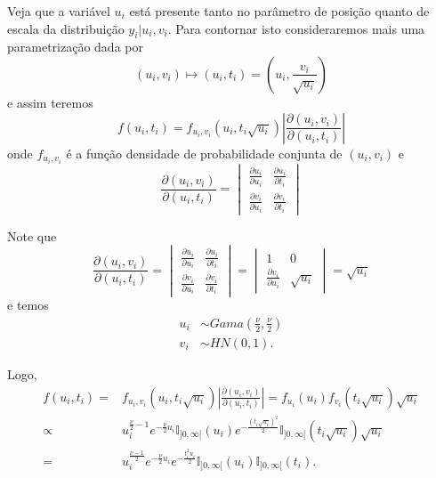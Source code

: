 Veja que a variável $u_i$ está presente tanto no parâmetro de posição quanto de escala da distribuição $y_i|u_i,v_i$. Para contornar isto consideraremos mais uma parametrização dada por 
\begin{equation}
(u_i,v_i)\mapsto (u_i,t_i)=\left(u_i,\frac{v_i}{\sqrt{u_i}}\right)
\end{equation}
e assim teremos
\begin{equation}
f(u_i,t_i)=f_{u_i,v_i}(u_i,t_i\sqrt{u_i})\left|\frac{\partial(u_i,v_i)}{\partial(u_i,t_i)}\right|
\end{equation}
onde $f_{u_i,v_i}$ é a função densidade de probabilidade conjunta de $(u_i,v_i)$ e 
\begin{equation}
\frac{\partial(u_i,v_i)}{\partial(u_i,t_i)}=
\begin{vmatrix}
\frac{\partial u_i}{\partial u_i} & \frac{\partial u_i}{\partial t_i} \\
\frac{\partial v_i}{\partial u_i} & \frac{\partial v_i}{\partial t_i}
\end{vmatrix}
\end{equation}

Note que 
\begin{equation}
\frac{\partial(u_i,v_i)}{\partial(u_i,t_i)}=
\begin{vmatrix}
\frac{\partial u_i}{\partial u_i} & \frac{\partial u_i}{\partial t_i} \\
\frac{\partial v_i}{\partial u_i} & \frac{\partial v_i}{\partial t_i}
\end{vmatrix}=
\begin{vmatrix}
1 & 0 \\
\frac{\partial v_i}{\partial u_i} & \sqrt{u_i}
\end{vmatrix}=\sqrt{u_i}
\end{equation}
e temos
\begin{equation}
\begin{split}
u_i & \sim  Gama\left(\frac{\nu}{2},\frac{\nu}{2}\right) \\
v_i & \sim  HN(0,1).
\end{split}
\end{equation}

Logo,
\begin{equation}\label{eq:f_ut_st}
\begin{split}
f(u_i,t_i)=&f_{u_i,v_i}(u_i,t_i\sqrt{u_i})\left|\frac{\partial(u_i,v_i)}{\partial(u_i,t_i)}\right|=f_{u_i}(u_i)f_{v_i}(t_i\sqrt{u_i})\sqrt{u_i} \\
\propto & u_i^{\frac{\nu}{2}-1} e^{-\frac{\nu}{2}u_i}\mathbb{I}_{]0,\infty[} (u_i)e^{-\frac{(t_i\sqrt{u_i})^2}{2}}\mathbb{I}_{]0,\infty[}(t_i\sqrt{u_i})\sqrt{u_i} \\
=&u_i^{\frac{\nu-1}{2}}e^{-\frac{\nu}{2}u_i}e^{-\frac{t_i^2u_i}{2}}\mathbb{I}_{]0,\infty[}(u_i)\mathbb{I}_{]0,\infty[}(t_i).
\end{split}
\end{equation}
 
